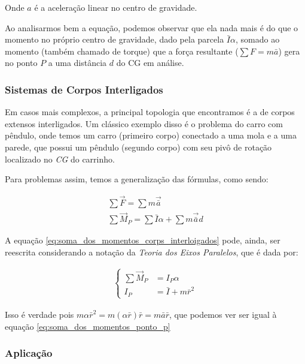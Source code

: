 \documentclass{article}
\begin{document}
Onde $a$ é a aceleração linear no centro de gravidade.

Ao analisarmos bem a equação, podemos observar que ela nada mais é do que o momento no próprio centro de gravidade, dado pela parcela $\bar I \alpha$, somado ao momento (também
chamado de torque) que a força resultante ($\sum F = m \bar a$) gera no ponto $P$ a uma distância $d$ do CG em análise.

\subsubsection[Sis. de Corps. Interligados]{Sistemas de Corpos Interligados}

Em casos mais complexos, a principal topologia que encontramos é a de corpos extensos interligados. Um clássico exemplo disso é o problema do carro com pêndulo, onde temos um carro
(primeiro corpo) conectado a uma mola e a uma parede, que possui um pêndulo (segundo corpo) com seu  pivô de rotação localizado no \emph{CG} do carrinho.

Para problemas assim, temos a generalização das fórmulas, como sendo:

\begin{align}
    \sum \vec F = \sum m \vec{\bar a} \label{eq:soma_das_forcas_corps_interligados} \\
    \sum \vec{M}_P = \sum \bar I  \alpha + \sum m \vec{\bar a} d \label{eq:soma_dos_momentos_corps_interloigados}
\end{align}

A equação \ref{eq:soma_dos_momentos_corps_interloigados} pode, ainda, ser reescrita considerando a notação da \emph{Teoria dos Eixos Paralelos}, que é dada por:

\begin{align}
    \begin{cases}
        \sum \vec{M}_P & = I_P \alpha          \\
        I_P            & = \bar I + m \bar r^2
    \end{cases}
\end{align}

Isso é verdade pois $m \alpha \bar r^2 = m (\alpha \bar r) \bar r = m \bar a \bar r $, que podemos ver ser igual à equação \ref{eq:soma_dos_momentos_ponto_p}

\subsubsection[Aplicação]{Aplicação}
\end{document}
